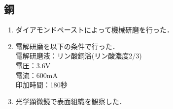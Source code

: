 \subsection{銅}
\begin{enumerate}
    \item ダイアモンドペーストによって機械研磨を行った．
    \item 電解研磨を以下の条件で行った．\\
          電解研磨液：リン酸銅浴(リン酸濃度2/3)\\
          電圧：3.6V\\
          電流：600mA\\
          印加時間：180秒
    \item 光学顕微鏡で表面組織を観察した．
\end{enumerate}
